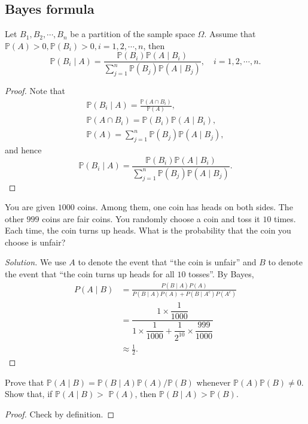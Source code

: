 \documentclass[11pt,singlecolumn, openany, citestyle=authoryear]{elegantbook}
\begin{document}
\begin{CJK}{UTF8}{gbsn}
\subsection{Bayes formula}
\begin{theorem}
    Let $B_1,B_2,\cdots,B_n$ be a partition of the sample space $\Omega$. Assume that 
    $\mathbb{P}(A)>0,\mathbb{P}(B_i)>0,i=1,2,\cdots,n$, then 
    \begin{equation}
        \mathbb{P}(B_i \mid A) = 
        \frac{\mathbb{P}(B_i)\mathbb{P}(A\mid B_i)}{\sum_{j=1}^n\mathbb{P}(B_j)\mathbb{P}(A\mid B_j)},
        \quad i = 1,2,\cdots,n.
    \end{equation}
\end{theorem}
\begin{proof}
    Note that 
    \begin{gather*}
        \mathbb{P}(B_i\mid A)=\frac{\mathbb{P}(A\cap B_i)}{\mathbb{P}(A)},\\
        \mathbb{P}(A \cap B_i)=\mathbb{P}(B_i)\mathbb{P}(A\mid B_i),\\
        \mathbb{P}(A)=\sum_{j=1}^n \mathbb{P}(B_j)\mathbb{P}(A \mid B_j),
    \end{gather*}
    and hence 
    $$
    \mathbb{P}(B_i \mid A) = 
    \frac{\mathbb{P}(B_i)\mathbb{P}(A\mid B_i)}{\sum_{j=1}^n\mathbb{P}(B_j)\mathbb{P}(A\mid B_j)}.
    $$
\end{proof}
\begin{example}
    You are given $1000$ coins. Among them, one coin has heads on both sides. The other 
    $999$ coins are fair coins. You randomly choose a coin and toss it $10$ times. Each time,
    the coin turns up heads. What is the probability that the coin you choose is unfair?
\end{example}
\begin{proof}[Solution]
    We use $A$ to denote the event that ``the coin is unfair'' and 
    $B$ to denote the event that ``the coin turns up heads
    for all $10$ tosses''. By 
    Bayes,
    \begin{align*}
        P(A\mid B)&=\frac{P(B\mid A)P(A)}{P(B\mid A)P(A)+P(B\mid A^c)P(A^c)}\\
        &=\dfrac{1\times \dfrac{1}{1000}}{1\times \dfrac{1}{1000}+ \dfrac{1}{2^{10}}\times 
        \dfrac{999}{1000}}\\
        &\approx \frac{1}{2}.
    \end{align*}
\end{proof}

\begin{exercise}
    Prove that $\mathbb{P}(A \mid B)=\mathbb{P}(B \mid A) \mathbb{P}(A) / \mathbb{P}(B)$
    whenever $\mathbb{P}(A) \mathbb{P}(B) \neq 0$. Show that, 
    if $\mathbb{P}(A \mid B)>$ $\mathbb{P}(A)$, then $\mathbb{P}(B \mid A)>\mathbb{P}(B)$.
\end{exercise}
\begin{proof}
    Check by definition.
\end{proof}



\end{CJK}
\end{document}

